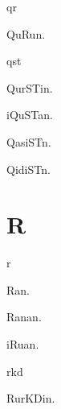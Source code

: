\begin{multicols*}{2}
\begin{dictroot}{q}{r}
    \begin{dictentry}{QuRu}{n.}
    \end{dictentry}
\end{dictroot}

\begin{dictroot}{q}{st}
    \begin{dictentry}{QurSTi}{n.}
    \end{dictentry}
    \begin{dictentry}{iQuSTa}{n.}
    \end{dictentry}
    \begin{dictentry}{QasiST}{n.}
    \end{dictentry}
    \begin{dictentry}{QidiST}{n.}
    \end{dictentry}
\end{dictroot}

\section*{R}

\begin{dictroot}{r}{\bigglot}
    \begin{dictentry}{Ra\bigglot}{n.}
    \end{dictentry}
    \begin{dictentry}{Rana\bigglot}{n.}
    \end{dictentry}
    \begin{dictentry}{iRu{\bigglot}a}{n.}
    \end{dictentry}
\end{dictroot}

\begin{dictroot}{r}{kd}
    \begin{dictentry}{RurKDi}{n.}
    \end{dictentry}
\end{dictroot}


\end{multicols*}
